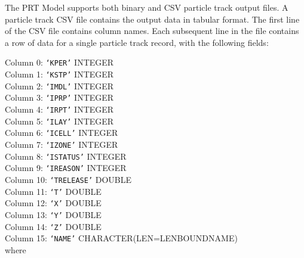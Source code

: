 The PRT Model supports both binary and CSV particle track output files. A particle track CSV file contains the output data in tabular format. The first line of the CSV file contains column names. Each subsequent line in the file contains a row of data for a single particle track record, with the following fields:

\vspace{5mm}
\noindent Column 0: \texttt{`KPER'} {\color{red} \footnotesize{INTEGER}} \\
\noindent Column 1: \texttt{`KSTP'} {\color{red} \footnotesize{INTEGER}} \\
\noindent Column 2: \texttt{`IMDL'} {\color{red} \footnotesize{INTEGER}} \\
\noindent Column 3: \texttt{`IPRP'} {\color{red} \footnotesize{INTEGER}} \\
\noindent Column 4: \texttt{`IRPT'} {\color{red} \footnotesize{INTEGER}} \\
\noindent Column 5: \texttt{`ILAY'} {\color{red} \footnotesize{INTEGER}} \\
\noindent Column 6: \texttt{`ICELL'} {\color{red} \footnotesize{INTEGER}} \\
\noindent Column 7: \texttt{`IZONE'} {\color{red} \footnotesize{INTEGER}} \\
\noindent Column 8: \texttt{`ISTATUS'} {\color{red} \footnotesize{INTEGER}} \\
\noindent Column 9: \texttt{`IREASON'} {\color{red} \footnotesize{INTEGER}} \\
\noindent Column 10: \texttt{`TRELEASE'} {\color{red} \footnotesize{DOUBLE}} \\
\noindent Column 11: \texttt{`T'} {\color{red} \footnotesize{DOUBLE}} \\
\noindent Column 12: \texttt{`X'} {\color{red} \footnotesize{DOUBLE}} \\
\noindent Column 13: \texttt{`Y'} {\color{red} \footnotesize{DOUBLE}} \\
\noindent Column 14: \texttt{`Z'} {\color{red} \footnotesize{DOUBLE}} \\
\noindent Column 15: \texttt{`NAME'} {\color{red} \footnotesize{CHARACTER(LEN=LENBOUNDNAME)}} \\

\vspace{2mm}
\noindent where

